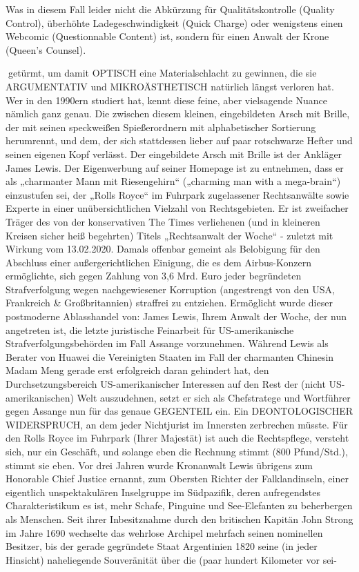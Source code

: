 \begin{multicols}{2}
Was in diesem Fall leider nicht die Abkürzung für Qualitätskontrolle (Quality Control), überhöhte Ladegeschwindigkeit (Quick Charge) oder wenigstens einen Webcomic (Questionnable Content) ist, sondern für einen
Anwalt der Krone (Queen’s Counsel).

getürmt, um damit OPTISCH eine Materialschlacht zu
gewinnen, die sie ARGUMENTATIV und MIKROÄSTHETISCH natürlich längst verloren hat. Wer in den 1990ern
studiert hat, kennt diese feine, aber vielsagende Nuance
nämlich ganz genau. Die zwischen diesem kleinen, eingebildeten Arsch mit Brille, der mit seinen speckweißen
Spießerordnern mit alphabetischer Sortierung herumrennt, und dem, der sich stattdessen lieber auf paar rotschwarze Hefter und seinen eigenen Kopf verlässt.
Der eingebildete Arsch mit Brille ist der Ankläger James
Lewis. Der Eigenwerbung auf seiner Homepage ist zu
entnehmen, dass er als „charmanter Mann mit Riesengehirn“ („charming man with a mega-brain“) einzustufen sei, der „Rolls Royce“ im Fuhrpark zugelassener
Rechtsanwälte sowie Experte in einer unübersichtlichen
Vielzahl von Rechtsgebieten. Er ist zweifacher Träger des
von der konservativen The Times verliehenen (und in
kleineren Kreisen sicher heiß begehrten) Titels „Rechtsanwalt der Woche“ - zuletzt mit Wirkung vom 13.02.2020.
Damals offenbar gemeint als Belobigung für den Abschluss einer außergerichtlichen Einigung, die es dem
Airbus-Konzern ermöglichte, sich gegen Zahlung von
3,6 Mrd. Euro jeder begründeten Strafverfolgung wegen
nachgewiesener Korruption (angestrengt von den USA,
Frankreich \& Großbritannien) straffrei zu entziehen. Ermöglicht wurde dieser postmoderne Ablasshandel von:
James Lewis, Ihrem Anwalt der Woche, der nun angetreten ist, die letzte juristische Feinarbeit für US-amerikanische Strafverfolgungsbehörden im Fall Assange vorzunehmen.
Während Lewis als Berater von Huawei die Vereinigten
Staaten im Fall der charmanten Chinesin Madam Meng
gerade erst erfolgreich daran gehindert hat, den Durchsetzungsbereich US-amerikanischer Interessen auf den
Rest der (nicht US-amerikanischen) Welt auszudehnen,
setzt er sich als Chefstratege und Wortführer gegen Assange nun für das genaue GEGENTEIL ein. Ein DEONTOLOGISCHER WIDERSPRUCH, an dem jeder Nichtjurist im Innersten zerbrechen müsste. Für den Rolls
Royce im Fuhrpark (Ihrer Majestät) ist auch die Rechtspflege, versteht sich, nur ein Geschäft, und solange eben
die Rechnung stimmt (800 Pfund/Std.), stimmt sie eben.
Vor drei Jahren wurde Kronanwalt Lewis übrigens zum
Honorable Chief Justice ernannt, zum Obersten Richter
der Falklandinseln, einer eigentlich unspektakulären Inselgruppe im Südpazifik, deren aufregendstes Charakteristikum es ist, mehr Schafe, Pinguine und See-Elefanten
zu beherbergen als Menschen. Seit ihrer Inbesitznahme
durch den britischen Kapitän John Strong im Jahre 1690
wechselte das wehrlose Archipel mehrfach seinen nominellen Besitzer, bis der gerade gegründete Staat Argentinien 1820 seine (in jeder Hinsicht) naheliegende
Souveränität über die (paar hundert Kilometer vor sei-


\end{multicols}
